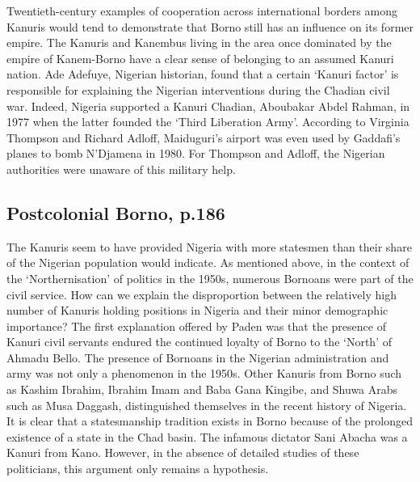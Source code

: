 \documentclass[12pt]{article}
\begin{document}
Twentieth-century examples of cooperation across international borders among
Kanuris would tend to demonstrate that Borno still has an influence on its
former empire. The Kanuris and Kanembus living in the area once dominated by the
empire of Kanem-Borno have a clear sense of belonging to  an assumed Kanuri
nation. Ade Adefuye, Nigerian historian, found that a certain `Kanuri factor' is
responsible for explaining the Nigerian interventions during the Chadian civil
war. Indeed, Nigeria supported a Kanuri Chadian, Aboubakar Abdel Rahman, in 1977
when the latter founded the `Third Liberation Army'. According to Virginia
Thompson and Richard Adloff, Maiduguri's airport was even used by Gaddafi's
planes to bomb N'Djamena in 1980. For Thompson and Adloff, the Nigerian
authorities were unaware of this military help.

\subsection{Postcolonial Borno, p.186}

The Kanuris seem to have provided Nigeria with more statesmen than their share
of the Nigerian population would indicate. As mentioned above, in the context of
the `Northernisation' of politics in the 1950s, numerous Bornoans were part of
the civil service. How can we explain the disproportion between the relatively
high number of Kanuris holding positions in Nigeria and their minor demographic
importance? The first explanation offered by Paden was that the presence of
Kanuri civil servants endured the continued loyalty of Borno to the `North' of
Ahmadu Bello. The presence of Bornoans in the Nigerian administration and army
was not only a phenomenon in the 1950s. Other Kanuris from Borno such as Kashim
Ibrahim, Ibrahim Imam and Baba Gana Kingibe, and Shuwa Arabs such as Musa
Daggash, distinguished themselves in the recent history of Nigeria. It is clear
that a statesmanship tradition exists in Borno because of the prolonged
existence of a state in the Chad basin. The infamous dictator Sani Abacha was a
Kanuri from Kano. However, in the absence of detailed studies of these
politicians, this argument only remains a hypothesis.

\pagebreak



\end{document}
